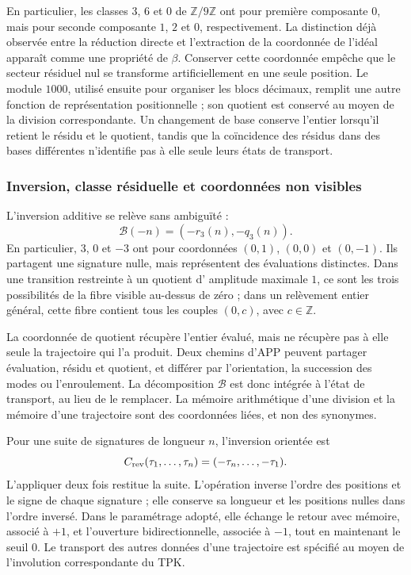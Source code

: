 En particulier, les classes \(3\), \(6\) et \(0\) de
\(\mathbb Z/9\mathbb Z\) ont pour première composante \(0\), mais pour seconde
composante \(1\), \(2\) et \(0\), respectivement. La distinction déjà observée
entre la réduction directe et l'extraction de la coordonnée de l'idéal apparaît
comme une propriété de \(\beta\). Conserver cette coordonnée empêche que le
secteur résiduel nul se transforme artificiellement en une seule position.
Le module \(1000\), utilisé ensuite pour organiser les blocs décimaux,
remplit une autre fonction de représentation positionnelle ; son quotient est conservé
au moyen de la division correspondante. Un changement de base conserve l'entier
lorsqu'il retient le résidu et le quotient, tandis que la coïncidence des résidus
dans des bases différentes n'identifie pas à elle seule leurs états de transport.

\subsubsection{Inversion, classe résiduelle et coordonnées non visibles}
\label{trit-ampl-inversion}

L'inversion additive se relève sans ambiguïté :
\[
 \mathcal B(-n)=(-r_3(n),-q_3(n)).
\]
En particulier, \(3\), \(0\) et \(-3\) ont pour coordonnées
\((0,1)\), \((0,0)\) et \((0,-1)\). Ils partagent une signature nulle, mais représentent des
évaluations distinctes. Dans une transition restreinte à un quotient d'
amplitude maximale \(1\), ce sont les trois possibilités de la fibre visible au-dessus de
zéro ; dans un relèvement entier général, cette fibre contient tous les couples
\((0,c)\), avec \(c\in\mathbb Z\).

La coordonnée de quotient récupère l'entier évalué, mais ne récupère pas à elle seule la trajectoire qui l'a produit. Deux chemins d'APP peuvent partager évaluation, résidu et quotient, et différer par l'orientation, la succession des modes ou l'enroulement. La décomposition \(\mathcal B\) est donc intégrée à l'état de transport, au lieu de le remplacer. La mémoire arithmétique d'une division et la mémoire d'une trajectoire sont des coordonnées liées, et non des synonymes.

Pour une suite de signatures de longueur \(n\), l'inversion orientée est
\[
 C_{\rm rev}(\tau_1,\ldots,\tau_n)
   =(-\tau_n,\ldots,-\tau_1).
\]
L'appliquer deux fois restitue la suite. L'opération inverse l'ordre des
positions et le signe de chaque signature ; elle conserve sa longueur et les
positions nulles dans l'ordre inversé. Dans le paramétrage adopté,
elle échange le retour avec mémoire, associé à \(+1\), et l'ouverture
bidirectionnelle, associée à \(-1\), tout en maintenant le seuil \(0\). Le transport
des autres données d'une trajectoire est spécifié au moyen de
l'involution correspondante du TPK.

